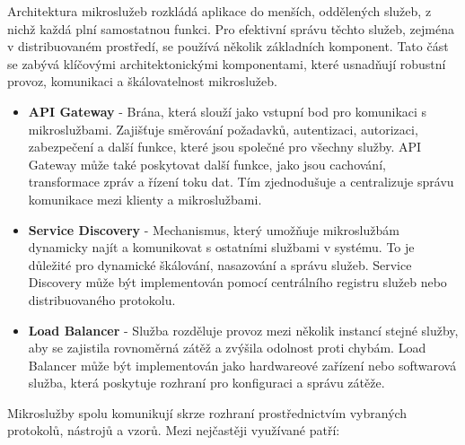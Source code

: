 
Architektura mikroslužeb rozkládá aplikace do menších, oddělených služeb, z nichž každá plní samostatnou funkci. Pro efektivní správu těchto služeb, zejména v distribuovaném prostředí, se používá několik základních komponent. Tato část se zabývá klíčovými architektonickými komponentami, které usnadňují robustní provoz, komunikaci a škálovatelnost mikroslužeb. \cite{Williams2023}


\begin{itemize}
    \item \textbf{API Gateway} - Brána, která slouží jako vstupní bod pro komunikaci s mikroslužbami. Zajišťuje směrování požadavků, autentizaci, autorizaci, zabezpečení a další funkce, které jsou společné pro všechny služby. API Gateway může také poskytovat další funkce, jako jsou cachování, transformace zpráv a řízení toku dat. Tím zjednodušuje a centralizuje správu komunikace mezi klienty a mikroslužbami.
    \item \textbf{Service Discovery} - Mechanismus, který umožňuje mikroslužbám dynamicky najít a komunikovat s ostatními službami v systému. To je důležité pro dynamické škálování, nasazování a správu služeb. Service Discovery může být implementován pomocí centrálního registru služeb nebo distribuovaného protokolu.
    \item \textbf{Load Balancer} - Služba rozděluje provoz mezi několik instancí stejné služby, aby se zajistila rovnoměrná zátěž a zvýšila odolnost proti chybám. Load Balancer může být implementován jako hardwareové zařízení nebo softwarová služba, která poskytuje rozhraní pro konfiguraci a správu zátěže.
\end{itemize}


Mikroslužby spolu komunikují skrze rozhraní prostřednictvím vybraných protokolů, nástrojů a vzorů. Mezi nejčastěji využívané patří:

